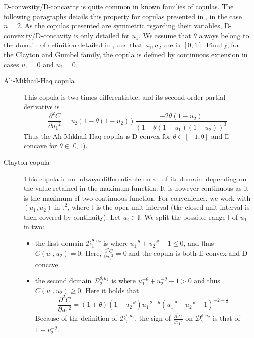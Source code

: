 \begin{remark}
    D-convexity/D-concavity is quite common in known families of copulas. The following paragraphs details this property for copulas presented in , in the case $n=2$.
    As the copulas presented are symmetric regarding their variables, D-convexity/D-concavity is only detailed for $u_1$. We assume that \( \theta \) always belong to the domain of definition detailed in , and that \(u_1, u_2\) are in \([0, 1]\). Finally, for the Clayton and Gumbel family, the copula is defined by continuous extension in cases $u_1=0$ and $u_2=0$. 
    \begin{description}
        \item[Ali-Mikhail-Haq copula] This copula is two times differentiable, and its second order partial derivative is
        $$\frac{\partial^2 C}{\partial {u_1}^2}=u_2(1-\theta(1-u_2))\frac{-2\theta(1-u_2)}{(1-\theta(1-u_1)(1-u_2))^3}$$
        Thus the Ali-Mikhail-Haq copula is D-convex for $\theta\in[-1,0]$ and D-concave for $\theta\in[0,1)$.
        \item[Clayton copula] This copula is not always differentiable on all of its domain, depending on the value retained in the maximum function. It is however continuous as it is the maximum of two continuous function. For convenience, we work with $(u_1, u_2)$ in $\mathbb{I}^2$, where $\mathbb{I}$ is the open unit interval (the closed unit interval is then covered by continuity). Let $u_2\in\mathbb{I}$. We split the possible range $\mathbb{I}$ of $u_1$ in two:
    \begin{itemize}
        \item the first domain $\mathcal{D}_1^{\theta,u_2}$ is where $u_1^{-\theta}+u_2^{-\theta}-1\leqslant0$, and thus $C(u_1, u_2)=0$. Here, $\frac{\partial^2 C}{\partial {u_1}^2}=0$ and the copula is both D-convex and D-concave.
        \item the second domain $\mathcal{D}_2^{\theta,u_2}$ is where $u_1^{-\theta}+u_2^{-\theta}-1>0$ and thus $C(u_1, u_2)\geqslant0$. Here it holds that
        $$\frac{\partial^2 C}{\partial {u_1}^2}=(1+\theta)(1-u_2^{-\theta})u_1^{-2-\theta}(u_1^{-\theta}+u_2^{-\theta}-1)^{-2-\frac{1}{\theta}}$$
        Because of the definition of $\mathcal{D}_2^{\theta,u_2}$, the sign of $\frac{\partial^2 C}{\partial {u_1}^2}$ on $\mathcal{D}_2^{\theta,u_2}$ is that of $1-u_2^{-\theta}$.
    \end{itemize}
    

\end{description}
\end{remark}
